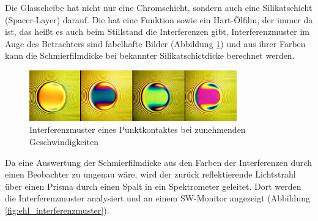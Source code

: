 Die Glasscheibe hat nicht nur eine Chromschicht, sondern auch eine Silikatschicht (Spacer-Layer) darauf.
Die hat eine Funktion sowie ein Hart-Ölfilm, der immer da ist, das heißt es auch beim Stillstand die Interferenzen gibt.
Interferenzmuster im Auge des Betrachters sind fabelhafte Bilder (Abbildung \ref{fig:ehl_bilder}) und aus ihrer Farben kann die Schmierfilmdicke bei bekannter Silikatschictdicke berechnet werden.
\begin{figure}[htb]
    \centering
    \includegraphics[width=0.8\textwidth]{./images/ehl_contact_at_increasing_speeds.png}
    \caption{Interferenzmuster eines Punktkontaktes bei zunehmenden Geschwindigkeiten \cite{ehl_broshure}}
    \label{fig:ehl_bilder}
\end{figure}
%

Da eine Auswertung der Schmierfilmdicke aus den Farben der Interferenzen durch einen Beobachter zu ungenau wäre, wird der zurück reflektierende Lichtstrahl über einen Prisma durch einen Spalt in ein Spektrometer geleitet.
Dort werden die Interferenzmuster analysiert und an einem SW-Monitor angezeigt (Abbildung \ref{fig:ehl_interferenzmuster}).

